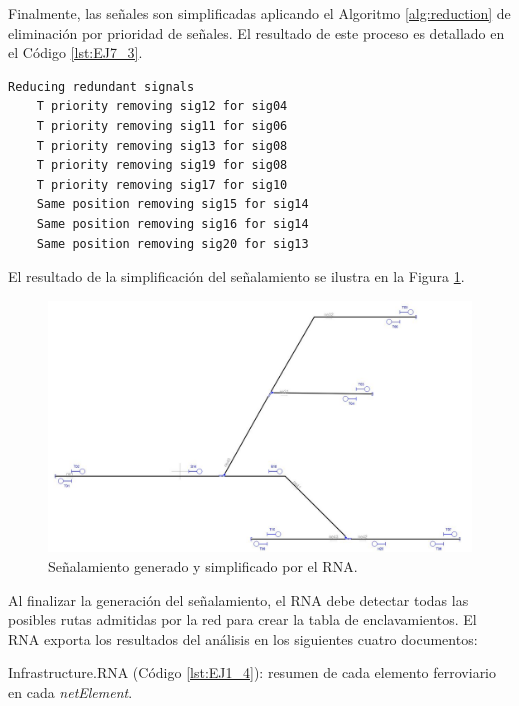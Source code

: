 	Finalmente, las señales son simplificadas aplicando el Algoritmo \ref{alg:reduction} de eliminación por prioridad de señales. El resultado de este proceso es detallado en el Código \ref{lst:EJ7_3}.
	
	\begin{lstlisting}[language = {}, caption = Reducción de señalamiento por prioridad de señales, label = {lst:EJ7_3}]
	Reducing redundant signals
	T priority removing sig12 for sig04
	T priority removing sig11 for sig06
	T priority removing sig13 for sig08
	T priority removing sig19 for sig08
	T priority removing sig17 for sig10
	Same position removing sig15 for sig14
	Same position removing sig16 for sig14
	Same position removing sig20 for sig13
	\end{lstlisting}
	
	El resultado de la simplificación del señalamiento se ilustra en la Figura \ref{fig:EJ7_7}.
	
	\begin{figure}[H]
		\centering
		\includegraphics[width=1\textwidth]{resultados-obtenidos/ejemplo7/images/7_RNA.png}
		\centering\caption{Señalamiento generado y simplificado por el RNA.}
		\label{fig:EJ7_7}
	\end{figure}
	
	Al finalizar la generación del señalamiento, el RNA debe detectar todas las posibles rutas admitidas por la red para crear la tabla de enclavamientos. El RNA exporta los resultados del análisis en los siguientes cuatro documentos:
	
	Infrastructure.RNA (Código \ref{lst:EJ1_4}): resumen de cada elemento ferroviario en cada \textit{netElement}.
	
